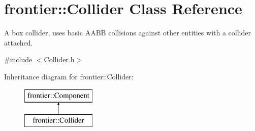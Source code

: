 \hypertarget{classfrontier_1_1_collider}{}\section{frontier\+:\+:Collider Class Reference}
\label{classfrontier_1_1_collider}


A box collider, uses basic A\+A\+BB collisions against other entities with a collider attached.  




{\ttfamily \#include $<$Collider.\+h$>$}

Inheritance diagram for frontier\+:\+:Collider\+:\begin{figure}[H]
\begin{center}
\leavevmode
\includegraphics[height=2.000000cm]{classfrontier_1_1_collider}
\end{center}
\end{figure}
